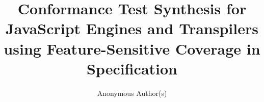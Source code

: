 \documentclass[acmsmall,screen]{acmart}
\begin{document}
\title[Conformance Test Synthesis for JavaScript Engines and Transpilers]
{Conformance Test Synthesis for JavaScript Engines and Transpilers
using Feature-Sensitive Coverage in Specification}

\author{Anonymous Author(s)}

%
%
%



%

\maketitle












\balance

\end{document}
